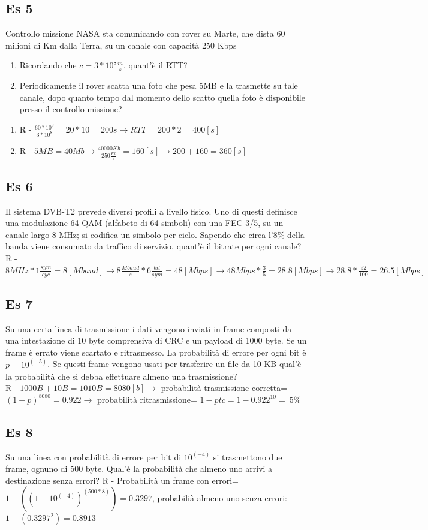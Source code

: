 \documentclass{article}
\begin{document}
    \subsection{Es 5}
      Controllo missione NASA sta comunicando con rover su Marte, che dista 60 milioni di Km dalla Terra, su un canale con capacità 250 Kbps
      \begin{enumerate}
        \item Ricordando che $c=3*10^8 \frac{m}{s}$, quant'è il RTT?
        \item Periodicamente il rover scatta una foto che pesa 5MB e la trasmette su tale canale, dopo quanto tempo dal momento dello scatto quella foto è disponibile presso il controllo missione?
      \end{enumerate}
      \begin{enumerate}
        \item R - $\frac{60*10^9}{3*10^8}=20*10=200s \rightarrow RTT=200*2=400 [s]$
        \item R - $5MB=40Mb \rightarrow \frac{40000 Kb}{250 \frac{Kb}{s}}=160 [s] \rightarrow 200+160=360 [s]$
      \end{enumerate}
    \subsection{Es 6}
      Il sistema DVB-T2 prevede diversi profili a livello fisico. Uno di questi definisce una modulazione 64-QAM (alfabeto di 64 simboli) con una FEC 3/5, su un canale largo 8 MHz; si codifica un simbolo per ciclo. Sapendo che circa l'8\% della banda viene consumato da traffico di servizio, quant'è il bitrate per ogni canale? \\
      R - $8MHz*1 \frac{sym}{cyc} = 8 [Mbaud] \rightarrow 8 \frac{Mbaud}{s} * 6 \frac{bit}{sym} = 48 [Mbps] \rightarrow 48Mbps*\frac{3}{5}= 28.8 [Mbps] \rightarrow 28.8*\frac{92}{100}=26.5 [Mbps]$
    \subsection{Es 7}
      Su una certa linea di trasmissione i dati vengono inviati in frame composti da una intestazione di 10 byte comprensiva di CRC e un payload di 1000 byte. Se un frame è errato viene scartato e ritrasmesso. La probabilità di errore per ogni bit è $p=10^(-5)$. Se questi frame vengono usati per trasferire un file da 10 KB qual'è la probabilità che si debba effettuare almeno una trasmissione? \\
      R - $1000B+10B=1010B=8080 [b] \rightarrow$ probabilità trasmissione corretta= $(1-p)^8080=0.922 \rightarrow$ probabilità ritrasmissione= $1-ptc=1-0.922^10=~5\%$ 
    \subsection{Es 8}
      Su una linea con probabilità di errore per bit di $10^(-4)$ si trasmettono due frame, ognuno di 500 byte. Qual'è la probabilità che almeno uno arrivi a destinazione senza errori?
      R - Probabilità un frame con errori= $1-((1-10^(-4))^(500*8))=0.3297$, probabilià almeno uno senza errori: $1-(0.3297^2)=0.8913$
\end{document}
